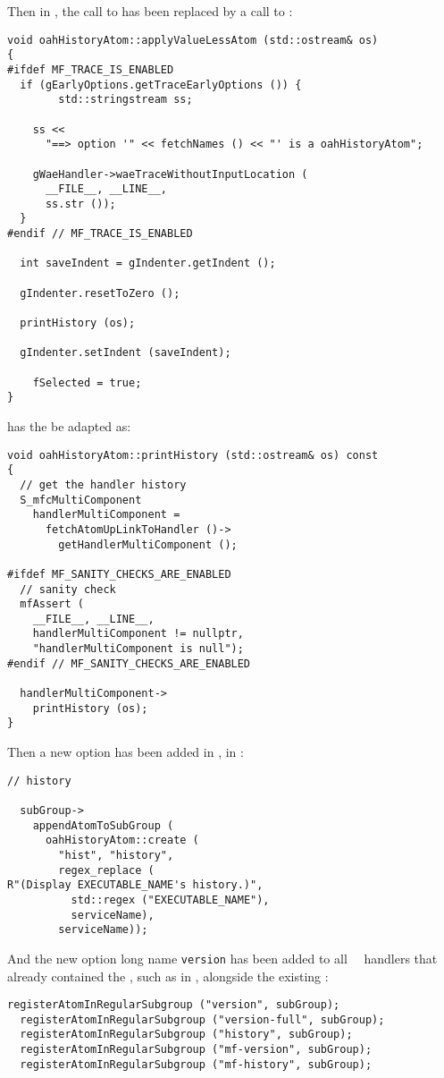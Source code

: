 Then in , the call to  has been replaced by a call to :
\begin{lstlisting}[language=CPlusPlus]
void oahHistoryAtom::applyValueLessAtom (std::ostream& os)
{
#ifdef MF_TRACE_IS_ENABLED
  if (gEarlyOptions.getTraceEarlyOptions ()) {
		std::stringstream ss;

    ss <<
      "==> option '" << fetchNames () << "' is a oahHistoryAtom";

    gWaeHandler->waeTraceWithoutInputLocation (
      __FILE__, __LINE__,
      ss.str ());
  }
#endif // MF_TRACE_IS_ENABLED

  int saveIndent = gIndenter.getIndent ();

  gIndenter.resetToZero ();

  printHistory (os);

  gIndenter.setIndent (saveIndent);

	fSelected = true;
}
\end{lstlisting}

\method{}{} has the be adapted as:
\begin{lstlisting}[language=CPlusPlus]
void oahHistoryAtom::printHistory (std::ostream& os) const
{
  // get the handler history
  S_mfcMultiComponent
    handlerMultiComponent =
      fetchAtomUpLinkToHandler ()->
        getHandlerMultiComponent ();

#ifdef MF_SANITY_CHECKS_ARE_ENABLED
  // sanity check
  mfAssert (
    __FILE__, __LINE__,
    handlerMultiComponent != nullptr,
    "handlerMultiComponent is null");
#endif // MF_SANITY_CHECKS_ARE_ENABLED

  handlerMultiComponent->
    printHistory (os);
}
\end{lstlisting}

Then a new option has been added in , in :
\begin{lstlisting}[language=CPlusPlus]
  // history

  subGroup->
    appendAtomToSubGroup (
      oahHistoryAtom::create (
        "hist", "history",
        regex_replace (
R"(Display EXECUTABLE_NAME's history.)",
          std::regex ("EXECUTABLE_NAME"),
          serviceName),
        serviceName));
\end{lstlisting}

And the new option long name {\tt version} has been added to all \regular\ \oahRepr\ handlers that already contained the , such as in , alongside the existing :
\begin{lstlisting}[language=CPlusPlus]
  registerAtomInRegularSubgroup ("version", subGroup);
  registerAtomInRegularSubgroup ("version-full", subGroup);
  registerAtomInRegularSubgroup ("history", subGroup);
  registerAtomInRegularSubgroup ("mf-version", subGroup);
  registerAtomInRegularSubgroup ("mf-history", subGroup);
\end{lstlisting}


